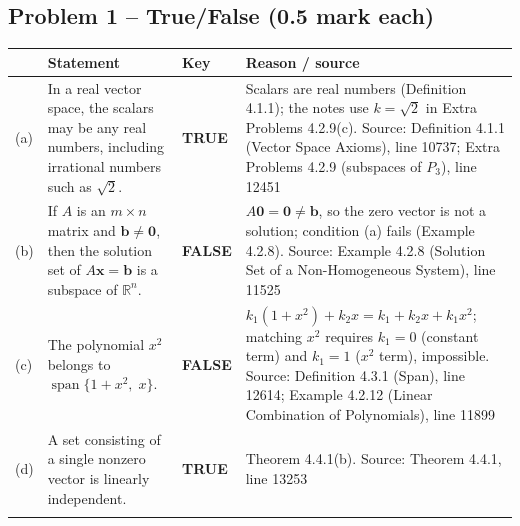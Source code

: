 \documentclass[11pt,a4paper]{article}
\newcommand{\Src}[1]{{\footnotesize\color{black!65}Source: #1}}
\begin{document}
\subsection*{Problem 1 -- True/False (0.5 mark each)}
\begin{tabularx}{\linewidth}{@{}l X l X@{}}\toprule & Statement & Key & Reason / source\\\midrule
(a) & In a real vector space, the scalars may be any real numbers, including irrational numbers such as $\sqrt{2}$. & \textbf{TRUE} & Scalars are real numbers (Definition 4.1.1); the notes use $k=\sqrt2$ in Extra Problems 4.2.9(c). \Src{Definition 4.1.1 (Vector Space Axioms), line 10737; Extra Problems 4.2.9 (subspaces of $P_3$), line 12451}\\\addlinespace
(b) & If $A$ is an $m\times n$ matrix and $\mathbf{b}\neq\mathbf{0}$, then the solution set of $A\mathbf{x}=\mathbf{b}$ is a subspace of $\mathbb{R}^n$. & \textbf{FALSE} & $A\mathbf{0}=\mathbf{0}\neq\mathbf{b}$, so the zero vector is not a solution; condition (a) fails (Example 4.2.8). \Src{Example 4.2.8 (Solution Set of a Non-Homogeneous System), line 11525}\\\addlinespace
(c) & The polynomial $x^2$ belongs to $\operatorname{span}\{1+x^2,\;x\}$. & \textbf{FALSE} & $k_1(1+x^2)+k_2x=k_1+k_2x+k_1x^2$; matching $x^2$ requires $k_1=0$ (constant term) and $k_1=1$ ($x^2$ term), impossible. \Src{Definition 4.3.1 (Span), line 12614; Example 4.2.12 (Linear Combination of Polynomials), line 11899}\\\addlinespace
(d) & A set consisting of a single nonzero vector is linearly independent. & \textbf{TRUE} & Theorem 4.4.1(b). \Src{Theorem 4.4.1, line 13253}\\\addlinespace
\bottomrule\end{tabularx}
\end{document}
